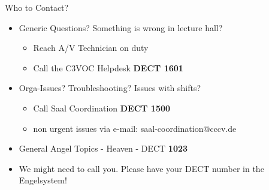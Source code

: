 
\begin{frame}{Who to Contact?}
	\begin{itemize}
		\item Generic Questions? Something is wrong in lecture hall?
		\begin{itemize}
			\item Reach A/V Technician on duty
			\item Call the C3VOC Helpdesk \textbf{DECT 1601}
		\end{itemize}
		\item Orga-Issues? Troubleshooting? Issues with shifts?
		\begin{itemize}
			\item Call Saal Coordination \textbf{DECT 1500}
			\item non urgent issues via e-mail: saal-coordination@cccv.de 
		\end{itemize}
		\item General Angel Topics - Heaven - DECT \textbf{1023}
		\item We might need to call you. Please have your DECT number in the Engelsystem!
	\end{itemize}
\end{frame}
